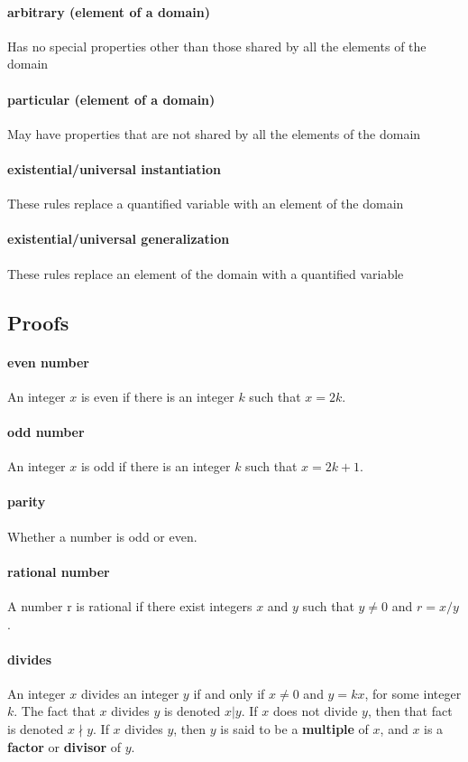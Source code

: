 \documentclass[a4paper]{article}
\begin{document}
\paragraph{arbitrary (element of a domain)} Has no special properties other than those shared by all the elements of the domain
\paragraph{particular (element of a domain)} May have properties that are not shared by all the elements of the domain
\paragraph{existential/universal instantiation} These rules replace a quantified variable with an element of the domain
\paragraph{existential/universal generalization} These rules replace an element of the domain with a quantified variable
\pagebreak
\subsection{Proofs}
\paragraph{even number} An integer $x$ is even if there is an integer $k$ such that $x = 2k$.
\paragraph{odd number} An integer $x$ is odd if there is an integer $k$ such that $x = 2k+1$.
\paragraph{parity} Whether a number is odd or even.
\paragraph{rational number} A number r is rational if there exist integers $x$ and $y$ such that $y \neq 0$ and $r = x/y$.
\paragraph{divides} An integer $x$ divides an integer $y$ if and only if $x \neq 0$ and $y = kx$, for some integer $k$. The fact that $x$ divides $y$ is denoted $x|y$. If $x$ does not divide $y$, then that fact is denoted $x \nmid y$. If $x$ divides $y$, then $y$ is said to be a \textbf{multiple} of $x$, and $x$ is a \textbf{factor} or \textbf{divisor} of $y$.
\end{document}
